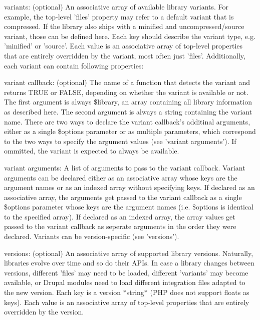 \begin{DoxyItemize}
\item variants: (optional) An associative array of available library variants. For example, the top-\/level 'files' property may refer to a default variant that is compressed. If the library also ships with a minified and uncompressed/source variant, those can be defined here. Each key should describe the variant type, e.g. 'minified' or 'source'. Each value is an associative array of top-\/level properties that are entirely overridden by the variant, most often just 'files'. Additionally, each variant can contain following properties:
\begin{DoxyItemize}
\item variant callback: (optional) The name of a function that detects the variant and returns TRUE or FALSE, depending on whether the variant is available or not. The first argument is always \$library, an array containing all library information as described here. The second argument is always a string containing the variant name. There are two ways to declare the variant callback's additinal arguments, either as a single \$options parameter or as multiple parameters, which correspond to the two ways to specify the argument values (see 'variant arguments'). If ommitted, the variant is expected to always be available.
\item variant arguments: A list of arguments to pass to the variant callback. Variant arguments can be declared either as an associative array whose keys are the argument names or as an indexed array without specifying keys. If declared as an associative array, the arguments get passed to the variant callback as a single \$options parameter whose keys are the argument names (i.e. \$options is identical to the specified array). If declared as an indexed array, the array values get passed to the variant callback as seperate arguments in the order they were declared. Variants can be version-\/specific (see 'versions').
\end{DoxyItemize}
\item versions: (optional) An associative array of supported library versions. Naturally, libraries evolve over time and so do their APIs. In case a library changes between versions, different 'files' may need to be loaded, different 'variants' may become available, or Drupal modules need to load different integration files adapted to the new version. Each key is a version $\ast$string$\ast$ (PHP does not support floats as keys). Each value is an associative array of top-\/level properties that are entirely overridden by the version.

\end{DoxyItemize}
